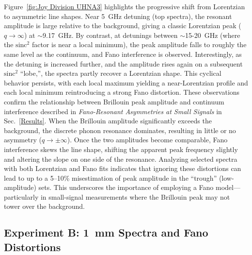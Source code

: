 \FloatBarrier

Figure~\ref{fig:Joy Division UHNA3} highlights the progressive shift from Lorentzian to asymmetric line shapes. Near \SI{5}{\giga\hertz} detuning (top spectra), the resonant amplitude is large relative to the background, giving a classic Lorentzian peak (\(q\to\infty\)) at \(\sim\)\SI{9.17}{\giga\hertz}. By contrast, at detunings between \(\sim\)15-\SI{20}{\giga\hertz} (where the \(\mathrm{sinc^{2}}\) factor is near a local minimum), the peak amplitude falls to roughly the same level as the continuum, and Fano interference is observed. Interestingly, as the detuning is increased further, and the amplitude rises again on a subsequent \(\mathrm{sinc^{2}}\) “lobe,”, the spectra partly recover a Lorentzian shape. This cyclical behavior persists, with each local maximum yielding a near-Lorentzian profile and each local minimum reintroducing a strong Fano distortion. These observations confirm the relationship between Brillouin peak amplitude and continuum interference described in \textit{Fano-Resonant Asymmetries at Small Signals} in Sec.~\ref{Results}. When the Brillouin amplitude significantly exceeds the background, the discrete phonon resonance dominates, resulting in little or no asymmetry (\(q\to\pm\infty\)). Once the two amplitudes become comparable, Fano interference skews the line shape, shifting the apparent peak frequency slightly and altering the slope on one side of the resonance. Analyzing selected spectra with both Lorentzian and Fano fits indicates that ignoring these distortions can lead to up to a 5–10\% misestimation of peak amplitude in the “trough” (low-amplitude) sets. This underscores the importance of employing a Fano model—particularly in small-signal measurements where the Brillouin peak may not tower over the background.

\subsection{Experiment B: \SI{1}{\milli\meter} \texorpdfstring{}{CS2} Spectra and Fano Distortions}
\label{Appendix:Fano:Experiment B}

